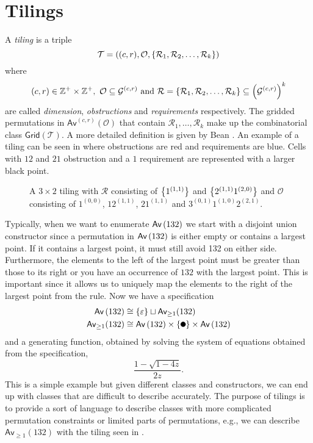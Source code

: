 \section{Tilings\label{sec:tilings}}
A \emph{tiling} is a triple
\[
\mathcal{T} = ((c,r), \mathcal{O}, \left\{\mathcal{R}_1,\mathcal{R}_2,\dotsc,\mathcal{R}_k\right\})
\]
where
\[
    (c,r) \in \mathbb{Z}^+ \times \mathbb{Z}^+, \ \mathcal{O} \subseteq \mathcal{G}^{(c,r)} \text{ and } \mathcal{R}=\left\{\mathcal{R}_1,\mathcal{R}_2,\dotsc,\mathcal{R}_k\right\} \subseteq \left(\mathcal{G}^{(c,r)}\right)^k
\]
are called \emph{dimension}, \emph{obstructions} and \emph{requirements} respectively. The gridded permutations in $\textsf{Av}^{(c,r)}\left(\mathcal{O}\right)$ that contain $\mathcal{R}_1,\dotsc,\mathcal{R}_k$ make up the combinatorial class $\textsf{Grid}(\mathcal{T})$. A more detailed definition is given by Bean \cite{BeanPhd:phd}. An example of a tiling can be seen in  where obstructions are red and requirements are blue. Cells with $12$ and $21$ obstruction and a $1$ requirement are represented with a larger black point.

\begin{figure}[ht!]
    \centering
    
    \caption{A $3 \times 2$ tiling with $\mathcal{R}$ consisting of $\left\{1^{(1,1)}\right\}$ and $\left\{2^{(1,1)}1^{(2,0)}\right\}$ and $\mathcal{O}$ consisting of $1^{(0,0)}$, $12^{(1,1)}$, $21^{(1,1)}$ and $3^{(0,1)}1^{(1,0)}2^{(2,1)}$.}
    \label{fig:tiling_example}
\end{figure}

Typically, when we want to enumerate $\textsf{Av}\left(132\right)$ we start with a disjoint union constructor since a permutation in $\textsf{Av}\left(132\right)$ is either empty or contains a largest point. If it contains a largest point, it must still avoid 132 on either side. Furthermore, the elements to the left of the largest point must be greater than those to its right or you have an occurrence of $132$ with the largest point. This is important since it allows us to uniquely map the elements to the right of the largest point from the rule. Now we have a specification
\begin{align*}
\Av{132} &\cong \set{\varepsilon} \sqcup \textsf{Av}_{\geq1}(132)\\
\textsf{Av}_{\geq1}(132) &\cong \Av{132} \times \set{\point{0.1}} \times \Av{132}
\end{align*}
and a generating function, obtained by solving the system of equations obtained from the specification,
\[
\frac{1-\sqrt{1-4z}}{2z}.
\]
This is a simple example but given different classes and constructors, we can end up with classes that are difficult to describe accurately. The purpose of tilings is to provide a sort of language to describe classes with more complicated permutation constraints or limited parts of permutations, e.g., we can describe $\textsf{Av}_{\geq1}(132)$ with the tiling seen in .

